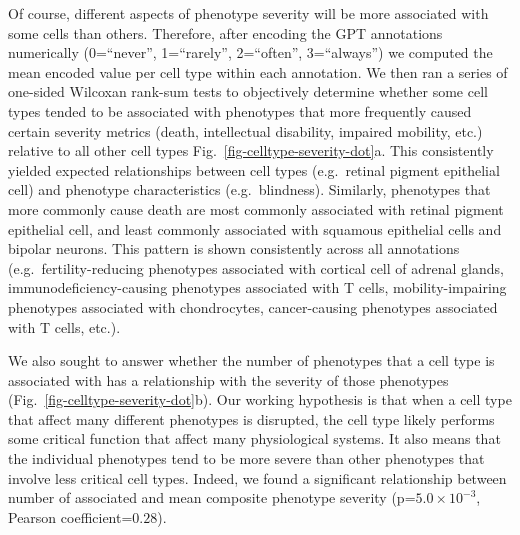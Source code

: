 \documentclass[
]{article}
\begin{document}
Of course, different aspects of phenotype severity will be more
associated with some cells than others. Therefore, after encoding the
GPT annotations numerically (0=``never'', 1=``rarely'', 2=``often'',
3=``always'') we computed the mean encoded value per cell type within
each annotation. We then ran a series of one-sided Wilcoxan rank-sum
tests to objectively determine whether some cell types tended to be
associated with phenotypes that more frequently caused certain severity
metrics (death, intellectual disability, impaired mobility, etc.)
relative to all other cell types Fig.~\ref{fig-celltype-severity-dot}a.
This consistently yielded expected relationships between cell types
(e.g.~retinal pigment epithelial cell) and phenotype characteristics
(e.g.~blindness). Similarly, phenotypes that more commonly cause death
are most commonly associated with retinal pigment epithelial cell, and
least commonly associated with squamous epithelial cells and bipolar
neurons. This pattern is shown consistently across all annotations
(e.g.~fertility-reducing phenotypes associated with cortical cell of
adrenal glands, immunodeficiency-causing phenotypes associated with T
cells, mobility-impairing phenotypes associated with chondrocytes,
cancer-causing phenotypes associated with T cells, etc.).

We also sought to answer whether the number of phenotypes that a cell
type is associated with has a relationship with the severity of those
phenotypes (Fig.~\ref{fig-celltype-severity-dot}b). Our working
hypothesis is that when a cell type that affect many different
phenotypes is disrupted, the cell type likely performs some critical
function that affect many physiological systems. It also means that the
individual phenotypes tend to be more severe than other phenotypes that
involve less critical cell types. Indeed, we found a significant
relationship between number of associated and mean composite phenotype
severity (p=\(5.0 \times 10^{-3}\), Pearson coefficient=\(0.28\)).
\end{document}
